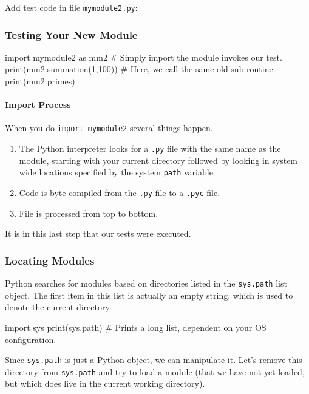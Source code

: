 \documentclass[12pt,letterpaper,twoside]{article}
\begin{document}
\begin{enumerate}
Add test code in file \texttt{mymodule2.py}:



\subsubsection{Testing Your New Module}

\begin{python}
import mymodule2 as mm2      # Simply import the module invokes our test.
print(mm2.summation(1,100))  # Here, we call the same old sub-routine.
print(mm2.primes)            
\end{python}

\paragraph{Import Process} 
When you do \texttt{import mymodule2} several things happen.

\begin{enumerate}
\def\labelenumi{\arabic{enumi}.}
\item
  The Python interpreter looks for a \texttt{.py} file with the same name as
  the module, starting with your current directory followed by looking
  in system wide locations specified by the system \texttt{path} variable.
\item
  Code is byte compiled from the \texttt{.py} file to a \texttt{.pyc}
  file.
\item
  File is processed from top to bottom.
\end{enumerate}

It is in this last step that our tests were executed.

\subsubsection{Locating Modules}
Python searches for modules based on directories listed in the 
\texttt{sys.path} list object. The first item in this list is actually an empty string,
which is used to denote the current directory.

\begin{python}
import sys
print(sys.path)   # Prints a long list, dependent on your OS configuration. 
\end{python}

Since \texttt{sys.path} is just a Python object, we can manipulate it.
Let's remove this directory from \texttt{sys.path} and try to load a
module (that we have not yet loaded, but which does live in the current working directory).


\end{enumerate}
\end{document}

